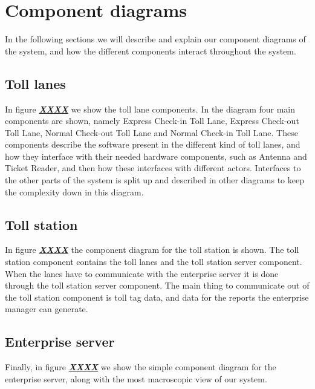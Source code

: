 \section*{Component diagrams}
In the following sections we will describe and explain our component diagrams of the system, and how the different components interact throughout the system.
\subsection*{Toll lanes}
In figure \textbf{\underline{\textit{XXXX}}} we show the toll lane components. In the diagram four main components are shown, namely Express Check-in Toll Lane, Express Check-out Toll Lane, Normal Check-out Toll Lane and Normal Check-in Toll Lane. These components describe the software present in the different kind of toll lanes, and how they interface with their needed hardware components, such as Antenna and Ticket Reader, and then how these interfaces with different actors. Interfaces to the other parts of the system is split up and described in other diagrams to keep the complexity down in this diagram.
\subsection*{Toll station}
In figure \textbf{\underline{\textit{XXXX}}} the component diagram for the toll station is shown. The toll station component contains the toll lanes and the toll station server component. When the lanes have to communicate with the enterprise server it is done through the toll station server component. The main thing to communicate out of the toll station component is toll tag data, and data for the reports the enterprise manager can generate.
\subsection*{Enterprise server}
Finally, in figure \textbf{\underline{\textit{XXXX}}} we show the simple component diagram for the enterprise server, along with the most macroscopic view of our system. 